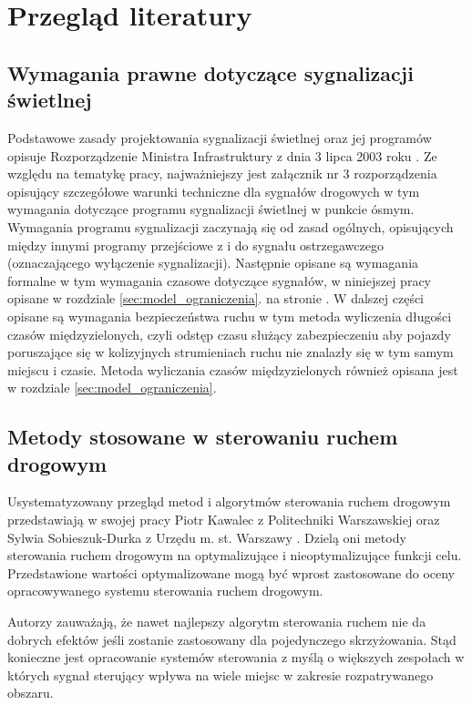 \chapter{Przegląd literatury}
\section{Wymagania prawne dotyczące sygnalizacji świetlnej}
Podstawowe zasady projektowania sygnalizacji świetlnej oraz jej programów opisuje Rozporządzenie Ministra Infrastruktury z dnia 3 lipca 2003 roku \cite{rozporzadzenie}.
Ze względu na tematykę pracy, najważniejszy jest załącznik nr 3 rozporządzenia opisujący szczegółowe warunki techniczne dla sygnałów drogowych w tym wymagania dotyczące programu sygnalizacji świetlnej w punkcie ósmym.
Wymagania programu sygnalizacji zaczynają się od zasad ogólnych, opisujących między innymi programy przejściowe z i do sygnału ostrzegawczego (oznaczającego wyłączenie sygnalizacji). Następnie opisane są wymagania formalne w tym wymagania czasowe dotyczące sygnałów, w niniejszej pracy opisane w rozdziale \ref{sec:model_ograniczenia}. na stronie \pageref{sec:model_ograniczenia}.
W dalszej części opisane są wymagania bezpieczeństwa ruchu w tym metoda wyliczenia długości czasów międzyzielonych, czyli odstęp czasu służący zabezpieczeniu aby pojazdy poruszające się w kolizyjnych strumieniach ruchu nie znalazły się w tym samym miejscu i czasie. Metoda wyliczania czasów międzyzielonych również opisana jest w rozdziale \ref{sec:model_ograniczenia}.

\section{Metody stosowane w sterowaniu ruchem drogowym}
Usystematyzowany przegląd metod i algorytmów sterowania ruchem drogowym przedstawiają w swojej pracy Piotr Kawalec z Politechniki Warszawskiej oraz Sylwia Sobieszuk\--Durka z Urzędu m. st. Warszawy \cite{kawalec+sobieszuk-durka}. Dzielą oni metody sterowania ruchem drogowym na optymalizujące i nieoptymalizujące funkcji celu.
Przedstawione wartości optymalizowane mogą być wprost zastosowane do oceny opracowywanego systemu sterowania ruchem drogowym.

Autorzy zauważają, że nawet najlepszy algorytm sterowania ruchem nie da dobrych efektów jeśli zostanie zastosowany dla pojedynczego skrzyżowania. Stąd konieczne jest opracowanie systemów sterowania z myślą o większych zespołach w których sygnał sterujący wpływa na wiele miejsc w zakresie rozpatrywanego obszaru.

